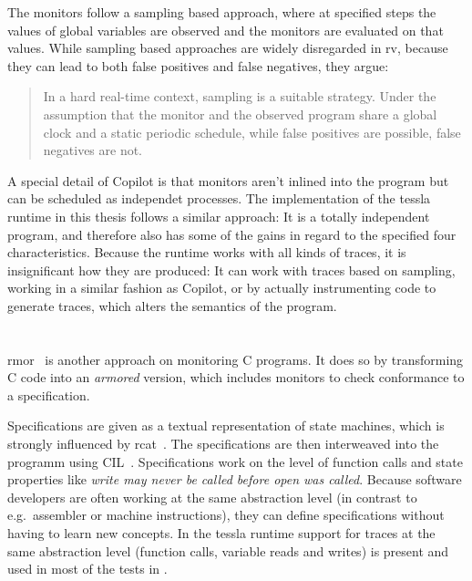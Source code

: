 The monitors follow a sampling based approach, where at specified steps the values of global variables are observed and the monitors are evaluated
on that values.
While sampling based approaches are widely disregarded in \gls{rv}, because they can lead to both false positives and false negatives,
they argue:

\begin{quote}
  In a hard real-time context, sampling is a suitable strategy.
  Under the assumption that the monitor and the observed program share a global clock and a static periodic schedule, while false positives are possible, false negatives are not.~\cite{Pike2010}
\end{quote}

A special detail of Copilot is that monitors aren't inlined into the program but can be scheduled as independet processes.
The implementation of the \gls{tessla} runtime in this thesis follows a similar approach: It is a totally independent program,
and therefore also has some of the gains in regard to the specified four characteristics.
Because the runtime works with all kinds of traces, it is insignificant how they are produced:
It can work with traces based on sampling, working in a similar fashion as Copilot, or by actually instrumenting code to generate
traces, which alters the semantics of the program.

\section{}
\label{sec:related:rmor}

\gls{rmor}~\citep{Havelund2008} is another approach on monitoring C programs.
It does so by transforming C code into an \emph{armored} version, which includes monitors to check conformance to a specification.

Specifications are given as a textual representation of state machines, which is strongly influenced by \gls{rcat}~\citep{Smith2008}.
The specifications are then interweaved into the programm using CIL~\cite{Necula2002}.
Specifications work on the level of function calls and state properties like \emph{write may never be called before open was called}.
Because software developers are often working at the same abstraction level (in contrast to e.g.\ assembler or machine instructions), they can define specifications without having to learn new concepts.
In the \gls{tessla} runtime support for traces at the same abstraction level (function calls, variable reads and writes) is present and used in most of the tests in .

